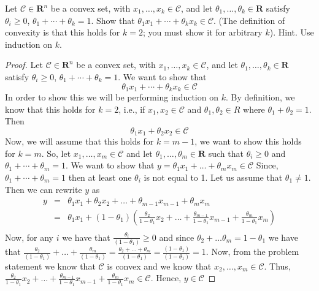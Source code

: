 \begin{prob}[1.1]
  Let $\mathcal{C} \in \mathbf{R}^{n}$ be a convex set, with $x_{1},  \ldots, x_{k} \in \mathcal{C}$, and let $\theta_{1}, \ldots, \theta_{k} \in \mathbf{R}$ satisfy $\theta_{i} \geq 0$, $\theta_{1} + \cdots + \theta_{k} = 1$. Show that $\theta_{1}x_{1} + \cdots + \theta_{k}x_{k} \in \mathcal{C}$. (The definition of convexity is that this holds for $k=2$; you must show it for arbitrary $k$). Hint. Use induction on $k$.  
\end{prob}
\begin{proof}  Let $\mathcal{C} \in \mathbf{R}^{n}$ be a convex set, with $x_{1},  \ldots, x_{k} \in \mathcal{C}$, and let $\theta_{1}, \ldots, \theta_{k} \in \mathbf{R}$ satisfy $\theta_{i} \geq 0$, $\theta_{1} + \cdots + \theta_{k} = 1$. We want to show that
  \[
  \theta_{1}x_{1} + \cdots + \theta_{k}x_{k} \in \mathcal{C}
  \]
  In order to show this we will be performing induction on $k$.  By definition,
  we know that this holds for $k=2$, i.e., if $x_{1},x_{2} \in \mathcal{C}$ and
  $\theta_{1},\theta_{2} \in {R}$ where $\theta_{1} + \theta_{2} = 1$. Then
  \[
  \theta_{1}x_{1} + \theta_{2}x_{2} \in \mathcal{C}
  \]
  Now, we will assume that this holds for $k = m-1$, we want to show this holds
  for $k = m$. So, let $x_{1}, \ldots, x_{m} \in \mathcal{C}$ and let
  $\theta_{1},\ldots,\theta_{m} \in \mathbf{R}$ such that $\theta_{i} \geq 0$ and
  $\theta_{1} + \cdots + \theta_{m} = 1$. We want to show that
  $y = \theta_{1}x_{1} + \ldots + \theta_{m}x_{m} \in \mathcal{C}$ Since,
  $\theta_{1} + \cdots + \theta_{m} = 1$ then at least one $\theta_{i}$ is
  not equal to 1.  Let us assume that $\theta_{1} \neq 1$. Then we can
  rewrite $y$ as
  \begin{eqnarray*}
    y &=& \theta_{1}x_{1} + \theta_{2}x_{2} + \ldots + \theta_{m-1}x_{m-1} + \theta_{m}x_{m}\\
    &=& \theta_{1}x_{1} + (1-\theta_{1})(\frac{\theta_{2}}{1-\theta_{1}}x_{2} + \ldots + \frac{\theta_{m-1}}{1-\theta_{1}}x_{m-1} + \frac{\theta_{m}}{1-\theta_{1}}x_{m})\\
  \end{eqnarray*}
  Now, for any $i$ we have that $\frac{\theta_{i}}{(1-\theta_{1})} \geq 0$ and since $\theta_{2} + \ldots \theta_{m} = 1-\theta_{1}$ we have that $\frac{\theta_{2}}{(1-\theta_{1})} + \ldots +  \frac{\theta_{m}}{(1-\theta_{1})} =
  \frac{\theta_{2} + \ldots + \theta_{m}}{(1-\theta_{1})} = \frac{(1 - \theta_{1})}{(1-\theta_{1})} = 1$.
  Now, from the problem statement we know that $\mathcal{C}$ is convex and we know that $x_{2},\ldots,x_{m} \in \mathcal{C}$.  Thus, $\frac{\theta_{2}}{1-\theta_{1}}x_{2} + \ldots + \frac{\theta_{m-1}}{1-\theta_{1}}x_{m-1} + \frac{\theta_{m}}{1-\theta_{1}}x_{m} \in \mathcal{C}$. Hence, $y \in \mathcal{C}$
\end{proof}
